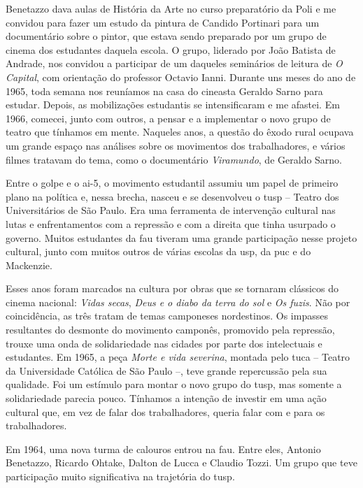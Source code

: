 Benetazzo dava aulas de História da Arte no curso preparatório da Poli e
me convidou para fazer um estudo da pintura de Candido Portinari para um
documentário sobre o pintor, que estava sendo preparado por um grupo de
cinema dos estudantes daquela escola. O grupo, liderado por João
Batista de Andrade, nos convidou a participar de um daqueles seminários
de leitura de {\it O Capital}, com orientação do professor Octavio
Ianni. Durante uns meses do ano de 1965, toda semana nos reuníamos na
casa do cineasta Geraldo Sarno para estudar. Depois, as mobilizações
estudantis se intensificaram e me afastei. Em 1966, comecei, junto com
outros, a pensar e a implementar o novo grupo de teatro que tínhamos em
mente. Naqueles anos, a questão do êxodo rural ocupava um grande espaço nas
análises sobre os movimentos dos trabalhadores, e vários filmes tratavam
do tema, como o documentário {\it Viramundo}, de Geraldo Sarno.

Entre o golpe e o {\sc ai}-5, o movimento estudantil assumiu um papel de
primeiro plano na política e, nessa brecha, nasceu e se
desenvolveu o {\sc tusp} -- Teatro dos Universitários de São Paulo. Era uma
ferramenta de intervenção cultural nas lutas e enfrentamentos com a
repressão e com a direita que tinha usurpado o governo. Muitos estudantes da
{\sc fau} tiveram uma grande participação nesse projeto cultural, junto com
muitos outros de várias escolas da {\sc usp}, da {\sc puc} e do Mackenzie.

\subject{O {\cap tusp}}

Esses anos foram marcados na cultura por obras que se tornaram clássicos
do cinema nacional: {\it Vidas secas}, {\it Deus e o diabo da terra do
sol} e {\it Os fuzis}. Não por coincidência, as três tratam de temas
camponeses nordestinos. Os impasses resultantes do desmonte do movimento camponês, promovido pela repressão, trouxe uma onda de solidariedade nas
cidades por parte dos intelectuais e estudantes. Em 1965, a peça
{\it Morte e vida severina}, montada pelo {\sc tuca} -- Teatro da Universidade
Católica de São Paulo --, teve grande repercussão pela sua qualidade. Foi um
estímulo para montar o novo grupo do {\sc tusp}, mas somente a solidariedade
parecia pouco. Tínhamos a intenção de investir em uma ação cultural que,
em vez de falar dos trabalhadores, queria falar com e para os
trabalhadores.

Em 1964, uma nova turma de calouros entrou na {\sc fau}. Entre eles, Antonio
Benetazzo, Ricardo Ohtake, Dalton de Lucca e Claudio Tozzi. Um grupo que
teve participação muito significativa na trajetória do {\sc tusp}.

